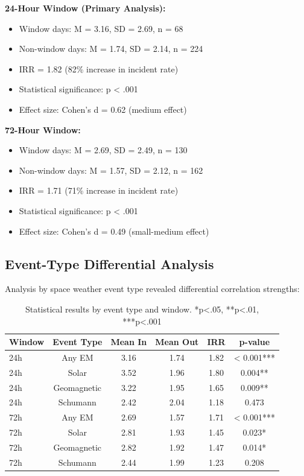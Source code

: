 \documentclass[11pt,a4paper]{article}
\begin{document}
\textbf{24-Hour Window (Primary Analysis):}
\begin{itemize}
\item Window days: M = 3.16, SD = 2.69, n = 68
\item Non-window days: M = 1.74, SD = 2.14, n = 224
\item IRR = 1.82 (82\% increase in incident rate)
\item Statistical significance: p < .001
\item Effect size: Cohen's d = 0.62 (medium effect)
\end{itemize}

\textbf{72-Hour Window:}
\begin{itemize}
\item Window days: M = 2.69, SD = 2.49, n = 130
\item Non-window days: M = 1.57, SD = 2.12, n = 162
\item IRR = 1.71 (71\% increase in incident rate)
\item Statistical significance: p < .001
\item Effect size: Cohen's d = 0.49 (small-medium effect)
\end{itemize}

\subsection{Event-Type Differential Analysis}
Analysis by space weather event type revealed differential correlation strengths:

\begin{table}[h]
\centering
\begin{tabular}{|l|c|c|c|c|c|}
\hline
\textbf{Window} & \textbf{Event Type} & \textbf{Mean In} & \textbf{Mean Out} & \textbf{IRR} & \textbf{p-value} \\
\hline
24h & Any EM & 3.16 & 1.74 & 1.82 & < 0.001*** \\
24h & Solar & 3.52 & 1.96 & 1.80 & 0.004** \\
24h & Geomagnetic & 3.22 & 1.95 & 1.65 & 0.009** \\
24h & Schumann & 2.42 & 2.04 & 1.18 & 0.473 \\
72h & Any EM & 2.69 & 1.57 & 1.71 & < 0.001*** \\
72h & Solar & 2.81 & 1.93 & 1.45 & 0.023* \\
72h & Geomagnetic & 2.82 & 1.92 & 1.47 & 0.014* \\
72h & Schumann & 2.44 & 1.99 & 1.23 & 0.208 \\
\hline
\end{tabular}
\caption{Statistical results by event type and window. *p<.05, **p<.01, ***p<.001}
\end{table}
\end{document}
